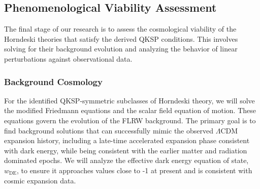\documentclass[twocolumn]{aastex631}
\begin{document}
\subsection{Phenomenological Viability Assessment}
The final stage of our research is to assess the cosmological viability of the Horndeski theories that satisfy the derived QKSP conditions. This involves solving for their background evolution and analyzing the behavior of linear perturbations against observational data.

\subsubsection{Background Cosmology}
For the identified QKSP-symmetric subclasses of Horndeski theory, we will solve the modified Friedmann equations and the scalar field equation of motion. These equations govern the evolution of the FLRW background. The primary goal is to find background solutions that can successfully mimic the observed $\Lambda$CDM expansion history, including a late-time accelerated expansion phase consistent with dark energy, while being consistent with the earlier matter and radiation dominated epochs. We will analyze the effective dark energy equation of state, $w_{\text{DE}}$, to ensure it approaches values close to -1 at present and is consistent with cosmic expansion data.
\end{document}
